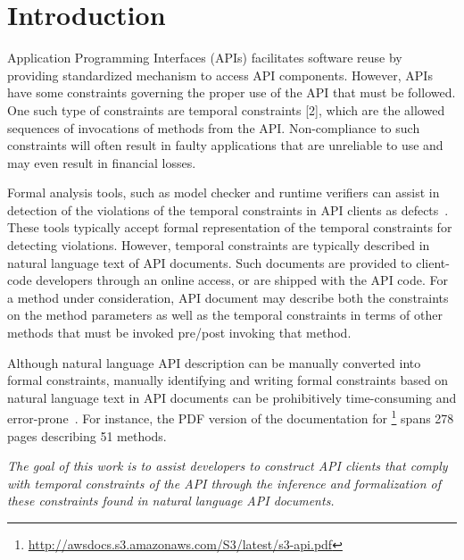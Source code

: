 \section{Introduction}
\label{sec:introduction}

Application Programming Interfaces (APIs) facilitates software reuse
by providing standardized mechanism to access API components.
However, APIs have some constraints governing the proper use of the API that must be followed.
One such type of constraints are temporal constraints [2], which are the allowed sequences of invocations of methods from the API.
Non-compliance to such constraints will often result in faulty applications that are unreliable to use and may even result in financial losses.

Formal analysis tools, such as model checker and runtime verifiers 
can assist in detection of the violations of the temporal constraints
in API clients as defects~\cite{lee2012towards}.
These tools typically accept formal representation of the temporal constraints for detecting violations.
However, temporal constraints are typically described in natural language text of API documents.
Such documents are provided to client-code developers through an online access, or are shipped with the API code.
For a method under consideration, API document may describe both the constraints on the method parameters
as well as the temporal constraints in terms of other methods that must be invoked pre/post invoking that method.

Although natural language API description can be manually converted into formal constraints,
manually identifying and writing formal constraints based on natural language text in API documents can be prohibitively time-consuming and error-prone~\cite{wu2013inferring,RubingerWEB10}. 
For instance, the PDF version of the documentation for \amazonAPI\footnote{{\small \url{http://awsdocs.s3.amazonaws.com/S3/latest/s3-api.pdf}}} spans 278 pages describing 51 methods.

\textit{The goal of this work is to assist developers to construct API clients that comply with temporal constraints of the API through the inference and formalization of these constraints found in natural language API documents.}

